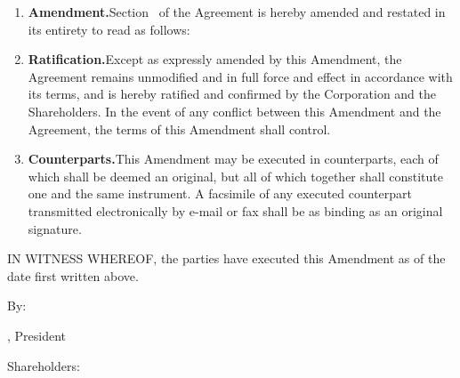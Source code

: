 \begin{enumerate}[leftmargin=*, label=\arabic*.]
	\item \textbf{Amendment.}\enspace Section \amendedSection\ of the Agreement is hereby
	amended and restated in its entirety to read as follows:

	\smallskip
	\begin{quote}
		\amendedText
	\end{quote}

	\item \textbf{Ratification.}\enspace Except as expressly amended by this Amendment, the
	Agreement remains unmodified and in full force and effect in accordance with its terms, and
	is hereby ratified and confirmed by the Corporation and the Shareholders. In the event of
	any conflict between this Amendment and the Agreement, the terms of this Amendment shall
	control.

	\item \textbf{Counterparts.}\enspace This Amendment may be executed in counterparts, each of
	which shall be deemed an original, but all of which together shall constitute one and the
	same instrument. A facsimile of any executed counterpart transmitted electronically by
	e-mail or fax shall be as binding as an original signature.
\end{enumerate}

\bigskip
\noindent IN WITNESS WHEREOF, the parties have executed this Amendment as of the date first
written above.

\bigskip
\noindent \companyName

\medskip
\noindent By: \sigline[3in]

\noindent \president, President

\bigskip
\noindent Shareholders:

